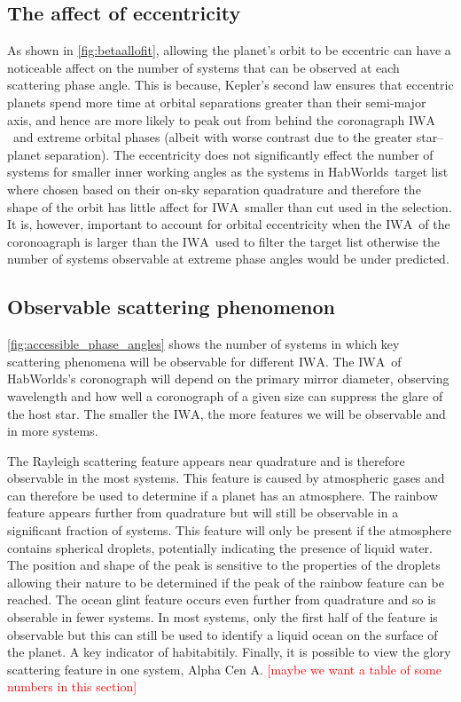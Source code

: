 \documentclass[
    usenatbib,
]{mnras}
\newcommand{\todo}[1]{\textcolor{red}{[#1]}}
\newcommand{\IWA}{\ensuremath{\mathrm{IWA}}}
\newcommand{\hwo}{HabWorlds}
\begin{document}

\subsection{The affect of eccentricity}
\label{sec:result_eccentricity}
As shown in \cref{fig:betaallofit}, allowing the planet's orbit to be eccentric can have a noticeable affect on the number of systems that can be observed at each scattering phase angle. This is because, Kepler's second law ensures that eccentric planets spend more time at orbital separations greater than their semi-major axis, and hence are more likely to peak out from behind the coronagraph \IWA\ and extreme orbital phases (albeit with worse contrast due to the greater star--planet separation). The eccentricity does not significantly effect the number of systems for smaller inner working angles as the systems in \hwo\ target list where chosen based on their on-sky separation quadrature and therefore the shape of the orbit has little affect for \IWA\ smaller than cut used in the selection. It is, however, important to account for orbital eccentricity when the \IWA\ of the coronoagraph is larger than the \IWA\ used to filter the target list otherwise the number of systems observable at extreme phase angles would be under predicted.


\subsection{Observable scattering phenomenon}
\label{sec:results_scattering_phenomena}

\cref{fig:accessible_phase_angles} shows the number of systems in which key scattering phenomena will be observable for different \IWA. The \IWA\ of \hwo's coronograph will depend on the primary mirror diameter, observing wavelength and how well a coronograph of a given size can suppress the glare of the host star. The smaller the \IWA, the more features we will be observable and in more systems. 

The Rayleigh scattering feature appears near quadrature and is therefore observable in the most systems. This feature is caused by atmospheric gases and can therefore be used to determine if a planet has an atmosphere. The rainbow feature appears further from quadrature but will still be observable in a significant fraction of systems. This feature will only be present if the atmosphere contains spherical droplets, potentially indicating the presence of liquid water. The position and shape of the peak is sensitive to the properties of the droplets allowing their nature to be determined if the peak of the rainbow feature can be reached. The ocean glint feature occurs even further from quadrature and so is obserable in fewer systems. In most systems, only the first half of the feature is observable but this can still be used to identify a liquid ocean on the surface of the planet. A key indicator of habitabitily. Finally, it is possible to view the glory scattering feature in one system, Alpha Cen A.
\todo{maybe we want a table of some numbers in this section}
\end{document}
